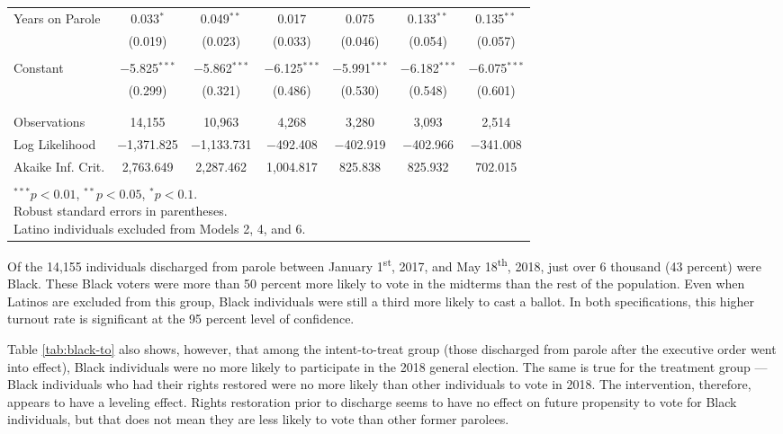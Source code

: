\documentclass[
  12pt,
]{article}
\begin{document}
\begin{singlespace}
\begin{table}[H]
\begin{tabular}{@{\extracolsep{5pt}}lcccccc}
Years on Parole & 0.033$^{*}$ & 0.049$^{**}$ & 0.017 & 0.075 & 0.133$^{**}$ & 0.135$^{**}$ \\
& (0.019) & (0.023) & (0.033) & (0.046) & (0.054) & (0.057) \\
& & & & & & \\
Constant & $-$5.825$^{***}$ & $-$5.862$^{***}$ & $-$6.125$^{***}$ & $-$5.991$^{***}$ & $-$6.182$^{***}$ & $-$6.075$^{***}$ \\
& (0.299) & (0.321) & (0.486) & (0.530) & (0.548) & (0.601) \\
& & & & & & \\
\hline \\[-1.8ex]
Observations & 14,155 & 10,963 & 4,268 & 3,280 & 3,093 & 2,514 \\
Log Likelihood & $-$1,371.825 & $-$1,133.731 & $-$492.408 & $-$402.919 & $-$402.966 & $-$341.008 \\
Akaike Inf. Crit. & 2,763.649 & 2,287.462 & 1,004.817 & 825.838 & 825.932 & 702.015 \\
\hline \\[-1.8ex]
\multicolumn{7}{l}{\scriptsize{\parbox{.5\linewidth}{\vspace{2pt}$^{***}p<0.01$, $^{**}p<0.05$, $^*p<0.1$. \\Robust standard errors in parentheses. \\Latino individuals excluded from Models 2, 4, and 6.}}}
\end{tabular}
\end{table}

\end{singlespace}

Of the 14,155 individuals discharged from parole between January 1\textsuperscript{st}, 2017, and May 18\textsuperscript{th}, 2018, just over 6 thousand (43 percent) were Black. These Black voters were more than 50 percent more likely to vote in the midterms than the rest of the population. Even when Latinos are excluded from this group, Black individuals were still a third more likely to cast a ballot. In both specifications, this higher turnout rate is significant at the 95 percent level of confidence.

Table \ref{tab:black-to} also shows, however, that among the intent-to-treat group (those discharged from parole after the executive order went into effect), Black individuals were no more likely to participate in the 2018 general election. The same is true for the treatment group --- Black individuals who had their rights restored were no more likely than other individuals to vote in 2018. The intervention, therefore, appears to have a leveling effect. Rights restoration prior to discharge seems to have no effect on future propensity to vote for Black individuals, but that does not mean they are less likely to vote than other former parolees.
\end{document}
